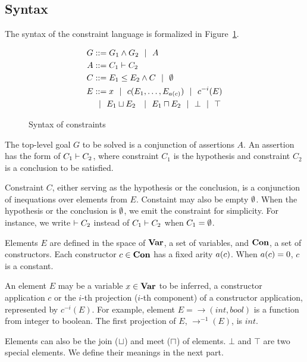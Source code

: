 \subsection{Syntax}

The syntax of the constraint language is formalized in
Figure~\ref{figure:lang:syntax}.

\begin{figure}
\hfil
\begin{minipage}{2in}
\begin{align*}
G &::= G_1 \land G_2 \ \ | \ \  A \\
A &::= C_1 \vdash C_2 \\
C &::= E_1 \leq E_2 \land C \ \ | \ \  \emptyset \\
E &::= x \ \ | \ \  c(E_1,\dots,E_{a(c)}) \ \ | \ \  c^{-i}(E) \\
  & \ \ | \ \  E_1 \sqcup E_2 \
\ \ | \ \  E_1 \sqcap E_2 \ \ | \ \  \bot \ \ | \ \  \top
\end{align*}
\end{minipage}
\hfil
\caption{Syntax of constraints}
\label{figure:lang:syntax}
\end{figure}

The top-level goal $G$ to be solved is a conjunction of assertions $A$. An
assertion has the form of $C_1 \vdash C_2$, where constraint $C_1$ is the
hypothesis and constraint $C_2$ is a conclusion to be satisfied.
 
Constraint $C$, either serving as the hypothesis or the conclusion, is a
conjunction of inequations over elements from $E$. Constaint may also be empty
$\emptyset$. When the hypothesis or the conclusion is $\emptyset$, we emit the
constraint for simplicity. For instance, we write $ \vdash C_2$ instead of $
C_1 \vdash C_2$ when $C_1=\emptyset$.

Elements $E$ are defined in the space of $\mathbf{Var}$, a set of variables, and
$\mathbf{Con}$, a set of constructors. Each constructor $c\in \mathbf{Con}$ has a fixed
arity $a(c)$.  When $a(c)=0$, $c$ is a constant.
 
An element $E$ may be a variable $x\in\mathbf{Var}$ to be inferred, a constructor
application $c$ or the $i$-th projection ($i$-th component) of a constructor
application, represented by $c^{-i}(E)$. For example, element
$E=\rightarrow(int, bool)$ is a function from integer to boolean. The first
projection of $E$, $\rightarrow^{-1} (E)$, is $int$.

Elements can also be the join ($\sqcup$) and meet ($\sqcap$) of elements. $\bot$
and $\top$ are two special elements. We define their meanings in the next part.

